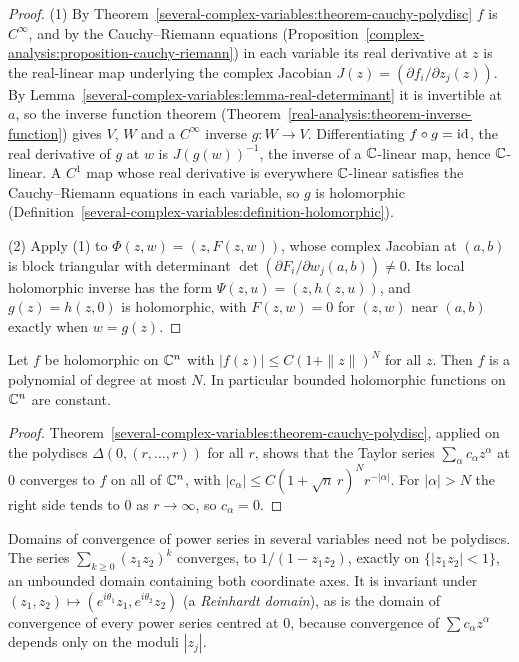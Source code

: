 \begin{proof}
(1) By Theorem~\ref{several-complex-variables:theorem-cauchy-polydisc} $f$ is $C^\infty$, and by the Cauchy--Riemann equations (Proposition~\ref{complex-analysis:proposition-cauchy-riemann}) in each variable its real
derivative at $z$ is the real-linear map underlying the complex Jacobian $J(z) = (\partial f_i/\partial z_j(z))$. By Lemma~\ref{several-complex-variables:lemma-real-determinant} it is invertible at $a$, so the inverse function
theorem (Theorem~\ref{real-analysis:theorem-inverse-function}) gives $V$, $W$ and a $C^\infty$ inverse $g \colon W \to V$. Differentiating $f \circ g = \mathrm{id}$, the real derivative of $g$ at $w$ is $J(g(w))^{-1}$, the inverse of a
$\mathbb{C}$-linear map, hence $\mathbb{C}$-linear. A $C^1$ map whose real derivative is everywhere $\mathbb{C}$-linear satisfies the Cauchy--Riemann equations in each variable, so $g$ is holomorphic
(Definition~\ref{several-complex-variables:definition-holomorphic}).

(2) Apply (1) to $\Phi(z, w) = (z, F(z, w))$, whose complex Jacobian at $(a, b)$ is block triangular with determinant $\det(\partial F_i/\partial w_j(a, b)) \neq 0$. Its local holomorphic inverse has the form
$\Psi(z, u) = (z, h(z, u))$, and $g(z) = h(z, 0)$ is holomorphic, with $F(z, w) = 0$ for $(z, w)$ near $(a, b)$ exactly when $w = g(z)$.
\end{proof}

\begin{corollary}[Liouville]\label{several-complex-variables:corollary-liouville}
Let $f$ be holomorphic on $\mathbb{C}^n$ with $|f(z)| \leq C(1 + \|z\|)^N$ for all $z$. Then $f$ is a polynomial of degree at most $N$. In particular bounded holomorphic functions on $\mathbb{C}^n$ are constant.
\end{corollary}

\begin{proof}
Theorem~\ref{several-complex-variables:theorem-cauchy-polydisc}, applied on the polydiscs $\Delta(0, (r, \ldots, r))$ for all $r$, shows that the Taylor series $\sum_\alpha c_\alpha z^\alpha$ at $0$ converges to $f$ on
all of $\mathbb{C}^n$, with $|c_\alpha| \leq C(1 + \sqrt{n}\,r)^Nr^{-|\alpha|}$. For $|\alpha| > N$ the right side tends to $0$ as $r \to \infty$, so $c_\alpha = 0$.
\end{proof}

\begin{example}\label{several-complex-variables:example-reinhardt}
Domains of convergence of power series in several variables need not be polydiscs. The series $\sum_{k \geq 0}(z_1z_2)^k$ converges, to $1/(1 - z_1z_2)$, exactly on $\{|z_1z_2| < 1\}$, an unbounded domain containing both
coordinate axes. It is invariant under $(z_1, z_2) \mapsto (e^{i\theta_1}z_1, e^{i\theta_2}z_2)$ (a \emph{Reinhardt domain}), as is the domain of convergence of every power series centred at $0$, because convergence of
$\sum c_\alpha z^\alpha$ depends only on the moduli $|z_j|$.
\end{example}

